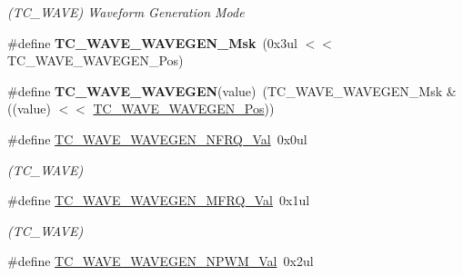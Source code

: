 \begin{DoxyCompactItemize}
\begin{DoxyCompactList}\small\item\em (T\+C\+\_\+\+W\+A\+V\+E) Waveform Generation Mode \end{DoxyCompactList}\item 
\hypertarget{group___s_a_m_l21___t_c_ga9ea020f51dcd12bae561ac8dc11063ad}{}\#define {\bfseries T\+C\+\_\+\+W\+A\+V\+E\+\_\+\+W\+A\+V\+E\+G\+E\+N\+\_\+\+Msk}~(0x3ul $<$$<$ T\+C\+\_\+\+W\+A\+V\+E\+\_\+\+W\+A\+V\+E\+G\+E\+N\+\_\+\+Pos)\label{group___s_a_m_l21___t_c_ga9ea020f51dcd12bae561ac8dc11063ad}

\item 
\hypertarget{group___s_a_m_l21___t_c_ga91dd92660e8f96b891f89ad4c785b2dd}{}\#define {\bfseries T\+C\+\_\+\+W\+A\+V\+E\+\_\+\+W\+A\+V\+E\+G\+E\+N}(value)~(T\+C\+\_\+\+W\+A\+V\+E\+\_\+\+W\+A\+V\+E\+G\+E\+N\+\_\+\+Msk \& ((value) $<$$<$ \hyperlink{group___s_a_m_l21___t_c_gabc51dddbbf88d5c313cb3ec2f41ce8d4}{T\+C\+\_\+\+W\+A\+V\+E\+\_\+\+W\+A\+V\+E\+G\+E\+N\+\_\+\+Pos}))\label{group___s_a_m_l21___t_c_ga91dd92660e8f96b891f89ad4c785b2dd}

\item 
\hypertarget{group___s_a_m_l21___t_c_ga13333a2a95c5eceba156466d88f707f4}{}\#define \hyperlink{group___s_a_m_l21___t_c_ga13333a2a95c5eceba156466d88f707f4}{T\+C\+\_\+\+W\+A\+V\+E\+\_\+\+W\+A\+V\+E\+G\+E\+N\+\_\+\+N\+F\+R\+Q\+\_\+\+Val}~0x0ul\label{group___s_a_m_l21___t_c_ga13333a2a95c5eceba156466d88f707f4}

\begin{DoxyCompactList}\small\item\em (T\+C\+\_\+\+W\+A\+V\+E) \end{DoxyCompactList}\item 
\hypertarget{group___s_a_m_l21___t_c_ga4ba086af52ba6f2dce795673307765f8}{}\#define \hyperlink{group___s_a_m_l21___t_c_ga4ba086af52ba6f2dce795673307765f8}{T\+C\+\_\+\+W\+A\+V\+E\+\_\+\+W\+A\+V\+E\+G\+E\+N\+\_\+\+M\+F\+R\+Q\+\_\+\+Val}~0x1ul\label{group___s_a_m_l21___t_c_ga4ba086af52ba6f2dce795673307765f8}

\begin{DoxyCompactList}\small\item\em (T\+C\+\_\+\+W\+A\+V\+E) \end{DoxyCompactList}\item 
\hypertarget{group___s_a_m_l21___t_c_ga5f58535293d3fe1b20c65403df600dca}{}\#define \hyperlink{group___s_a_m_l21___t_c_ga5f58535293d3fe1b20c65403df600dca}{T\+C\+\_\+\+W\+A\+V\+E\+\_\+\+W\+A\+V\+E\+G\+E\+N\+\_\+\+N\+P\+W\+M\+\_\+\+Val}~0x2ul\label{group___s_a_m_l21___t_c_ga5f58535293d3fe1b20c65403df600dca}


\end{DoxyCompactItemize}
